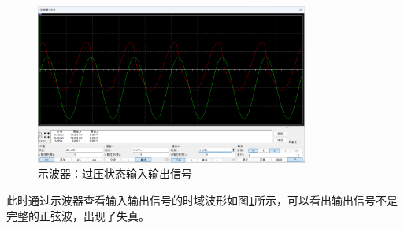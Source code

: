 \documentclass[UTF8]{ctexart}
\begin{document}
\begin{figure}[htbp]
    \centering
    \includegraphics[width=0.8\textwidth]{13.png}
    \caption{示波器：过压状态输入输出信号}
    \label{img:13}
\end{figure}
此时通过示波器查看输入输出信号的时域波形如图\ref{img:13}所示，可以看出输出信号不是完整的正弦波，出现了失真。
\end{document}
